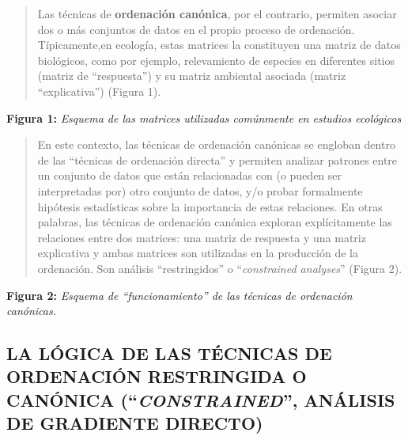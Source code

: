 \documentclass[
]{book}
\begin{document}
\begin{quote}
Las técnicas de \textbf{ordenación canónica}, por el contrario, permiten asociar dos o más conjuntos de datos en el propio proceso de ordenación. Típicamente,en ecología, estas matrices la constituyen una matriz de datos biológicos, como por ejemplo, relevamiento de especies en diferentes sitios (matriz de ``respuesta'') y su matriz ambiental asociada (matriz ``explicativa'') (Figura 1).
\end{quote}

\textbf{Figura 1:} \emph{Esquema de las matrices utilizadas comúnmente en estudios ecológicos}

\begin{quote}
En este contexto, las técnicas de ordenación canónicas se engloban dentro de las ``técnicas de ordenación directa'' y permiten analizar patrones entre un conjunto de datos que están relacionadas con (o pueden ser interpretadas por) otro conjunto de datos, y/o probar formalmente hipótesis estadísticas sobre la importancia de estas relaciones. En otras palabras, las técnicas de ordenación canónica exploran explícitamente las relaciones entre dos matrices: una matriz de respuesta y una matriz explicativa y ambas matrices son utilizadas en la producción de la ordenación. Son análisis ``restringidos'' o ``\emph{constrained analyses}'' (Figura 2).
\end{quote}

\textbf{Figura 2:} \emph{Esquema de ``funcionamiento'' de las técnicas de ordenación canónicas.}

\hypertarget{la-luxf3gica-de-las-tuxe9cnicas-de-ordenaciuxf3n-restringida-o-canuxf3nica-constrained-anuxe1lisis-de-gradiente-directo}{%
\subsection{\texorpdfstring{LA LÓGICA DE LAS TÉCNICAS DE ORDENACIÓN RESTRINGIDA O CANÓNICA (``\emph{CONSTRAINED}'', ANÁLISIS DE GRADIENTE DIRECTO)}{LA LÓGICA DE LAS TÉCNICAS DE ORDENACIÓN RESTRINGIDA O CANÓNICA (``CONSTRAINED'', ANÁLISIS DE GRADIENTE DIRECTO)}}\label{la-luxf3gica-de-las-tuxe9cnicas-de-ordenaciuxf3n-restringida-o-canuxf3nica-constrained-anuxe1lisis-de-gradiente-directo}}
\end{document}

